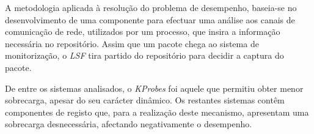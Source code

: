 




%
%


A metodologia aplicada à resolução do problema de desempenho, baseia-se no desenvolvimento de uma componente para efectuar uma análise aos canais de comunicação de rede, utilizados por um processo, que insira a informação necessária no repositório.
Assim que um pacote chega ao sistema de monitorização, o \textit{LSF} tira partido do repositório para decidir a captura do pacote.


De entre os sistemas analisados, o \textit{KProbes} foi aquele que permitiu obter menor sobrecarga, apesar do seu carácter dinâmico.
Os restantes sistemas contêm componentes de registo que, para a realização deste mecanismo, apresentam uma sobrecarga desnecessária, afectando negativamente o desempenho.

